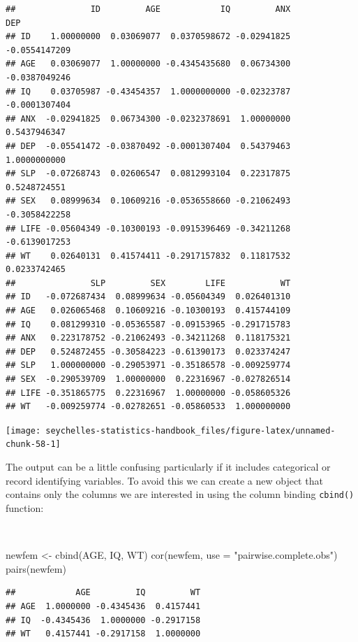 \documentclass[
  12pt,
]{book}
\newenvironment{Shaded}{\begin{snugshade}}{\end{snugshade}}
\newcommand{\AttributeTok}[1]{\textcolor[rgb]{0.77,0.63,0.00}{#1}}
\newcommand{\FunctionTok}[1]{\textcolor[rgb]{0.00,0.00,0.00}{#1}}
\newcommand{\NormalTok}[1]{#1}
\newcommand{\OtherTok}[1]{\textcolor[rgb]{0.56,0.35,0.01}{#1}}
\newcommand{\StringTok}[1]{\textcolor[rgb]{0.31,0.60,0.02}{#1}}
\begin{document}
\begin{verbatim}
##               ID         AGE            IQ         ANX           DEP
## ID    1.00000000  0.03069077  0.0370598672 -0.02941825 -0.0554147209
## AGE   0.03069077  1.00000000 -0.4345435680  0.06734300 -0.0387049246
## IQ    0.03705987 -0.43454357  1.0000000000 -0.02323787 -0.0001307404
## ANX  -0.02941825  0.06734300 -0.0232378691  1.00000000  0.5437946347
## DEP  -0.05541472 -0.03870492 -0.0001307404  0.54379463  1.0000000000
## SLP  -0.07268743  0.02606547  0.0812993104  0.22317875  0.5248724551
## SEX   0.08999634  0.10609216 -0.0536558660 -0.21062493 -0.3058422258
## LIFE -0.05604349 -0.10300193 -0.0915396469 -0.34211268 -0.6139017253
## WT    0.02640131  0.41574411 -0.2917157832  0.11817532  0.0233742465
##               SLP         SEX        LIFE           WT
## ID   -0.072687434  0.08999634 -0.05604349  0.026401310
## AGE   0.026065468  0.10609216 -0.10300193  0.415744109
## IQ    0.081299310 -0.05365587 -0.09153965 -0.291715783
## ANX   0.223178752 -0.21062493 -0.34211268  0.118175321
## DEP   0.524872455 -0.30584223 -0.61390173  0.023374247
## SLP   1.000000000 -0.29053971 -0.35186578 -0.009259774
## SEX  -0.290539709  1.00000000  0.22316967 -0.027826514
## LIFE -0.351865775  0.22316967  1.00000000 -0.058605326
## WT   -0.009259774 -0.02782651 -0.05860533  1.000000000
\end{verbatim}

\newpage

\begin{center}\texttt{[image: seychelles-statistics-handbook\_files/figure-latex/unnamed-chunk-58-1]} \end{center}

The output can be a little confusing particularly if it includes categorical or record identifying variables. To avoid this we can create a new object that contains only the columns we are interested in using the column binding \texttt{cbind()} function:

~

\begin{Shaded}
\begin{Highlighting}[]
\NormalTok{newfem }\OtherTok{\textless{}{-}} \FunctionTok{cbind}\NormalTok{(AGE, IQ, WT)}
\FunctionTok{cor}\NormalTok{(newfem, }\AttributeTok{use =} \StringTok{"pairwise.complete.obs"}\NormalTok{)}
\FunctionTok{pairs}\NormalTok{(newfem)}
\end{Highlighting}
\end{Shaded}

\begin{verbatim}
##            AGE         IQ         WT
## AGE  1.0000000 -0.4345436  0.4157441
## IQ  -0.4345436  1.0000000 -0.2917158
## WT   0.4157441 -0.2917158  1.0000000
\end{verbatim}
\end{document}
